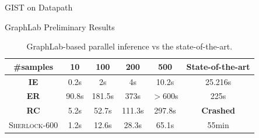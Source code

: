 \documentclass[onlymath,xcolor=pdftex,dvipsnames,table]{beamer}
\newcommand{\sherlock}{\textsc{Sherlock}\xspace}
\newcommand{\gist}{\textsc{GIST}\xspace}
\begin{document}

\begin{frame}{\gist on Datapath}

\end{frame}



\begin{frame}{GraphLab Preliminary Results}
\begin{table}
  \centering
  \begin{tabular}{|cccccc|}\hline
    \textbf{\#samples} & 10 & 100 & 200 & 500 & State-of-the-art\\
    \hline
    \textbf{IE}   & 0.2s & 2s & 4s & 10.2s & 25.216s  \\
    \textbf{ER}   & 90.8s & 181.5s & 373s & $>$600s & 225s \\
    \textbf{RC}   & 5.2s & 52.7s & 111.3s & 297.8s & \textbf{\color{Red}Crashed} \\
    \sherlock-600 & 1.2s & 12.6s & 28.3s & 65.1s & 55min \\
    \hline
  \end{tabular}
  \caption{GraphLab-based parallel inference vs the state-of-the-art.}
\end{table}
\end{frame}
\end{document}
